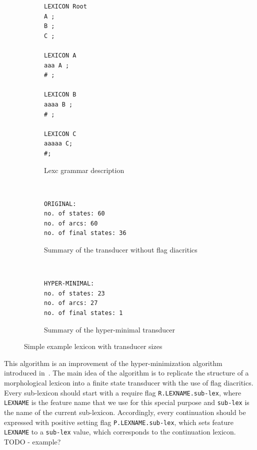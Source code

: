 \documentclass[11pt]{article}
\begin{document}
\begin{figure}[htbp]
    \centering

\begin{subfigure}[t]{0.3\textwidth}
\begin{verbatim}
LEXICON Root
A ;
B ;
C ;

LEXICON A
aaa A ;
# ;

LEXICON B
aaaa B ;
# ;

LEXICON C
aaaaa C;
#;
\end{verbatim}
\caption{Lexc grammar description
\label{fig:lexc-a2}}
\end{subfigure}
 ~ %
\begin{subfigure}[t]{0.3\textwidth}
\begin{verbatim}
ORIGINAL:
no. of states: 60
no. of arcs: 60
no. of final states: 36
\end{verbatim}
\caption{Summary of the transducer without flag diacritics
\label{fig:sizes-orig}}
\end{subfigure}%
 ~ %
\begin{subfigure}[t]{0.3\textwidth}
\begin{verbatim}
HYPER-MINIMAL:
no. of states: 23
no. of arcs: 27
no. of final states: 1
\end{verbatim}
\caption{Summary of the hyper-minimal transducer
\label{fig:sizes-flags}}
 \end{subfigure}

 \caption{Simple example lexicon with transducer sizes}
 \label{fig:simple-ex}
\end{figure}


This algorithm is an improvement of the hyper-minimization algorithm introduced in~. The main idea of the algorithm is to 
replicate the structure of a morphological lexicon into a finite state transducer with the use of flag diacritics. Every sub-lexicon should start 
with a require flag \verb+R.LEXNAME.sub-lex+, where \verb+LEXNAME+ is the feature name that we use for this special purpose
and \verb+sub-lex+ is the name of the current sub-lexicon. Accordingly, every continuation should be expressed with positive setting flag 
\verb+P.LEXNAME.sub-lex+, which sets feature \verb+LEXNAME+ to a \verb+sub-lex+ value, which corresponds to the continuation lexicon.
TODO - example?
\end{document}
